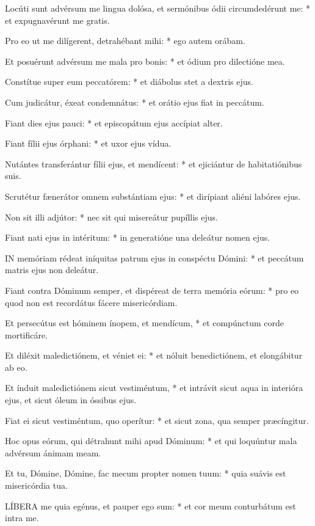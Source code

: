 Locúti sunt advérsum me lingua dolósa, et sermónibus ódii circumdedérunt me: * et expugnavérunt me gratis.

Pro eo ut me dilígerent, detrahébant mihi: * ego autem orábam.

Et posuérunt advérsum me mala pro bonis: * et ódium pro dilectióne mea.

Constítue super eum peccatórem: * et diábolus stet a dextris ejus.

Cum judicátur, éxeat condemnátus: * et orátio ejus fiat in peccátum.

Fiant dies ejus pauci: * et episcopátum ejus accípiat alter.

Fiant fílii ejus órphani: * et uxor ejus vídua.

Nutántes transferántur fílii ejus, et mendícent: * et ejiciántur de habitatiónibus suis.

Scrutétur fænerátor omnem substántiam ejus: * et dirípiant aliéni labóres ejus.

Non sit illi adjútor: * nec sit qui misereátur pupíllis ejus.

Fiant nati ejus in intéritum: * in generatióne una deleátur nomen ejus.


\lettrine[lines=2]{I}{N} memóriam rédeat iníquitas patrum ejus in conspéctu Dómini: * et peccátum matris ejus non deleátur.

Fiant contra Dóminum semper, et dispéreat de terra memória eórum: * pro eo quod non est recordátus fácere misericórdiam.

Et persecútus est hóminem ínopem, et mendícum, * et compúnctum corde mortificáre.

Et diléxit maledictiónem, et véniet ei: * et nóluit benedictiónem, et elongábitur ab eo.

Et índuit maledictiónem sicut vestiméntum, * et intrávit sicut aqua in interióra ejus, et sicut óleum in óssibus ejus.

Fiat ei sicut vestiméntum, quo operítur: * et sicut zona, qua semper præcíngitur.

Hoc opus eórum, qui détrahunt mihi apud Dóminum: * et qui loquúntur mala advérsum ánimam meam.

Et tu, Dómine, Dómine, fac mecum propter nomen tuum: * quia suávis est misericórdia tua.


\lettrine[lines=2]{L}{ÍBERA} me quia egénus, et pauper ego sum: * et cor meum conturbátum est intra me.

